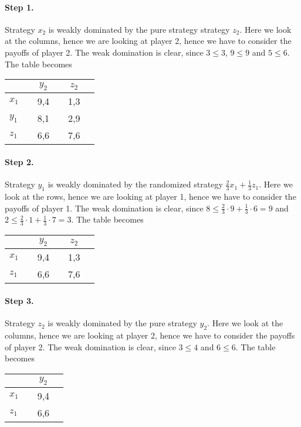 \paragraph{Step 1.} Strategy $x_{2}$ is weakly dominated by the pure strategy strategy $z_{2}$. Here we look at the columns, hence we are looking at player 2, hence we have to consider the payoffs of player 2. The weak domination is clear, since $3 \leq 3$, $9 \leq 9$ and $5 \leq 6$. The table becomes

\begin{tabular}[h!]{l|ccccc}
		&& $y_2$ && $z_2$ \\
		\hline
		$x_1$ && 9,4 && 1,3 & \\
		$y_1$ && 8,1 && 2,9 & \\
		$z_1$ && 6,6 && 7,6 &
	\end{tabular} 
	
	\paragraph{Step 2.} Strategy $y_{1}$ is weakly dominated by the randomized strategy $\frac{2}{3} x_{1} + \frac{1}{3} z_{1}$. Here we look at the rows, hence we are looking at player 1, hence we have to consider the payoffs of player 1. The weak domination is clear, since $8 \leq \frac{2}{3} \cdot 9 + \frac{1}{3} \cdot 6 = 9$ and $2 \leq \frac{2}{3} \cdot 1 + \frac{1}{3} \cdot 7 = 3$. The table becomes

\begin{tabular}[h!]{l|ccccc}
		&& $y_2$ && $z_2$ \\
		\hline
		$x_1$ && 9,4 && 1,3 & \\
		$z_1$ && 6,6 && 7,6 &
	\end{tabular} 
	
\paragraph{Step 3.} Strategy $z_{2}$ is weakly dominated by the pure strategy $y_{2}$. Here we look at the columns, hence we are looking at player 2, hence we have to consider the payoffs of player 2. The weak domination is clear, since $3 \leq 4$ and $6 \leq 6$. The table becomes

\begin{tabular}[h!]{l|ccc}
		&& $y_2$ \\
		\hline
		$x_1$ && 9,4 & \\
		$z_1$ && 6,6 &
	\end{tabular} 

